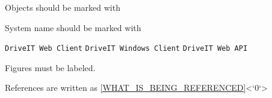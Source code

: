 
Objects should be marked with \texttt{}

System name should be marked with \texttt{}

\texttt{DriveIT Web Client}
\texttt{DriveIT Windows Client}
\texttt{DriveIT Web API}

Figures must be labeled.

References are written as \ref{WHAT_IS_BEING_REFERENCED}<`0`>
